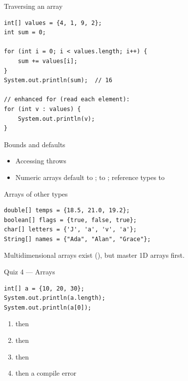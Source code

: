 \documentclass[aspectratio=169,11pt]{beamer}
\begin{document}
    \begin{frame}[fragile]{Traversing an array}
        \begin{lstlisting}
int[] values = {4, 1, 9, 2};
int sum = 0;

for (int i = 0; i < values.length; i++) {
    sum += values[i];
}
System.out.println(sum);  // 16

// enhanced for (read each element):
for (int v : values) {
    System.out.println(v);
}
        \end{lstlisting}
    \end{frame}

    \begin{frame}{Bounds and defaults}
        \begin{itemize}
            \item Accessing  throws
            \item Numeric arrays default to ;  to ;
            reference types to 
        \end{itemize}
        \vspace{0.4em}
    \end{frame}

    \begin{frame}[fragile]{Arrays of other types}
        \begin{lstlisting}
double[] temps = {18.5, 21.0, 19.2};
boolean[] flags = {true, false, true};
char[] letters = {'J', 'a', 'v', 'a'};
String[] names = {"Ada", "Alan", "Grace"};
        \end{lstlisting}
        \vspace{0.3em}
        Multidimensional arrays exist (), but master 1D arrays first.
    \end{frame}

    \begin{frame}[fragile]{Quiz 4 --- Arrays}
        \begin{lstlisting}
int[] a = {10, 20, 30};
System.out.println(a.length);
System.out.println(a[0]);
        \end{lstlisting}
        \begin{enumerate}
            \item {} then 
            \item {} then 
            \item {} then 
            \item {} then a compile error
        \end{enumerate}
        \quizpause
    \end{frame}
\end{document}
